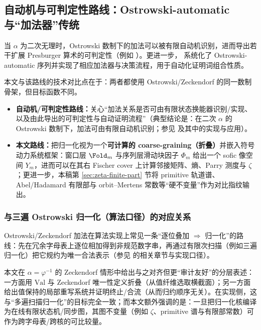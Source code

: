 \subsection{自动机与可判定性路线：Ostrowski-automatic 与“加法器”传统}
当 $\alpha$ 为二次无理时，Ostrowski 数制下的加法可以被有限自动机识别，进而导出若干扩展 Presburger 算术的可判定性（例如 \cite{HieronymiTerry2018OstrowskiAddition}）。更进一步，\cite{BaranwalaSchaefferShallit2021OstrowskiAutomatic} 系统化了 Ostrowski-automatic 序列并实现了相应加法器与决策流程，用于自动化证明词组合性质。

本文与该路线的技术对比点在于：两者都使用 Ostrowski/Zeckendorf 的同一数制骨架，但目标函数不同。
\begin{itemize}
  \item \textbf{自动机/可判定性路线：}关心“加法关系是否可由有限状态换能器识别/实现、以及由此导出的可判定性与自动证明流程”（典型结论是：在二次 $\alpha$ 的 Ostrowski 数制下，加法可由有限自动机识别；参见 \cite{HieronymiTerry2018OstrowskiAddition,BaranwalaSchaefferShallit2021OstrowskiAutomatic} 及其中的实现与应用）。
  \item \textbf{本文路线：}把归一化视为一个\textbf{可计算的 coarse-graining（折叠）}并嵌入符号动力系统框架：窗口层 $\Fold_m$ 与序列层滑动块因子 $\Phi_m$ 给出一个 sofic 像空间 $Y_m$，进而可以在其右 Fischer cover 上计算邻接矩阵、熵、Parry 测度与 $\zeta$；更进一步，本稿第 \ref{sec:zeta-finite-part} 节将 primitive 轨道谱、Abel/Hadamard 有限部与 orbit--Mertens 常数等“硬不变量”作为对比指纹输出。
\end{itemize}

\subsubsection{与三遍 Ostrowski 归一化（算法口径）的对应关系}
Ostrowski/Zeckendorf 加法在算法实现上常见一条“逐位叠加 $\Rightarrow$ 归一化”的路线：先在冗余字母表上逐位相加得到非规范数字串，再通过有限次扫描（例如三遍归一化）把它规约为唯一合法表示（参见 \cite{HieronymiTerry2018OstrowskiAddition,Frougny1992NumbersAutomata} 的相关章节与实现口径）。

本文在 $\alpha=\varphi^{-1}$ 的 Zeckendorf 情形中给出与之对齐但更“审计友好”的分层表述：一方面用 $\mathrm{Val}$ 与 Zeckendorf 唯一性定义折叠（从值纤维选取横截面）；另一方面给出值保持的局部重写系统并证明终止/合流（从而归约顺序无关）。在实现侧，这与“多遍扫描归一化”的目标完全一致；而本文额外强调的是：一旦把归一化核编译为在线有限状态机/同步图，其图不变量（例如 $\zeta$、primitive 谱与有限部常数）可作为跨字母表/跨核的可比较量。

